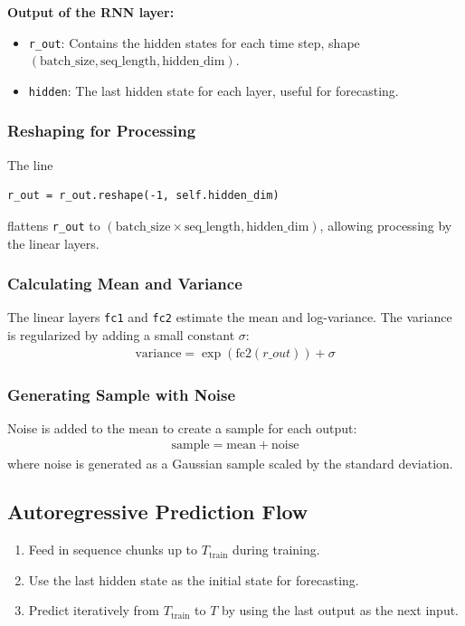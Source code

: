 \documentclass{article}
\begin{document}
\textbf{Output of the RNN layer:}
\begin{itemize}
    \item \texttt{r\_out}: Contains the hidden states for each time step, shape $(\text{batch\_size}, \text{seq\_length}, \text{hidden\_dim})$.
    \item \texttt{hidden}: The last hidden state for each layer, useful for forecasting.
\end{itemize}

\subsubsection{Reshaping for Processing}
The line
\begin{verbatim}
r_out = r_out.reshape(-1, self.hidden_dim)
\end{verbatim}
flattens \texttt{r\_out} to $(\text{batch\_size} \times \text{seq\_length}, \text{hidden\_dim})$, allowing processing by the linear layers.

\subsubsection{Calculating Mean and Variance}
The linear layers \texttt{fc1} and \texttt{fc2} estimate the mean and log-variance. The variance is regularized by adding a small constant $\sigma$:
\begin{align}
\text{variance} = \exp(\text{fc2}(r\_out)) + \sigma
\end{align}

\subsubsection{Generating Sample with Noise}
Noise is added to the mean to create a sample for each output:
\begin{align}
\text{sample} = \text{mean} + \text{noise}
\end{align}
where noise is generated as a Gaussian sample scaled by the standard deviation.

\subsection{Autoregressive Prediction Flow}
\begin{enumerate}
    \item Feed in sequence chunks up to $T_{\text{train}}$ during training.
    \item Use the last hidden state as the initial state for forecasting.
    \item Predict iteratively from $T_{\text{train}}$ to $T$ by using the last output as the next input.
\end{enumerate}
\end{document}
